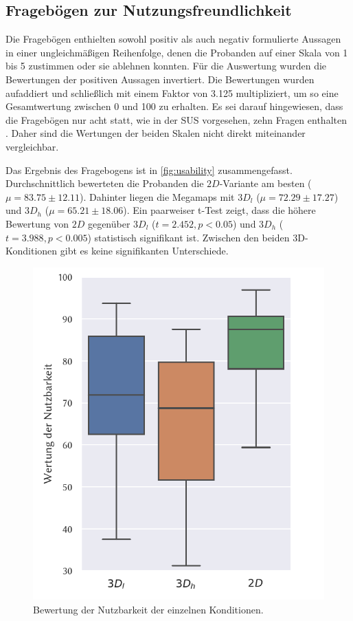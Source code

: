 \subsection{Fragebögen zur Nutzungsfreundlichkeit}
Die Fragebögen enthielten sowohl positiv als auch negativ formulierte Aussagen in einer ungleichmäßigen Reihenfolge, denen die Probanden auf einer Skala von 1 bis 5 zustimmen oder sie ablehnen konnten.
Für die Auswertung wurden die Bewertungen der positiven Aussagen invertiert.
Die Bewertungen wurden aufaddiert und schließlich mit einem Faktor von \num{3,125} multipliziert, um so eine Gesamtwertung zwischen 0 und 100 zu erhalten.
Es sei darauf hingewiesen, dass die Fragebögen nur acht statt, wie in der SUS vorgesehen, zehn Fragen enthalten \autocite{Brooke2013}. 
Daher sind die Wertungen der beiden Skalen nicht direkt miteinander vergleichbar.

Das Ergebnis des Fragebogens ist in \autoref{fig:usability} zusammengefasst.
Durchschnittlich bewerteten die Probanden die $2D$-Variante am besten ($\mu = \num{83,75} \pm \num{12,11}$).
Dahinter liegen die Megamaps mit $3D_l$ ($\mu = \num{72,29} \pm \num{17,27}$) und $3D_h$ ($\mu = \num{65,21} \pm \num{18.06}$).
Ein paarweiser t-Test zeigt, dass die höhere Bewertung von $2D$ gegenüber $3D_l$ ($t = 2.452, p < 0.05$) und $3D_h$ ($t = 3.988, p < 0.005$) statistisch signifikant ist.
Zwischen den beiden 3D-Konditionen gibt es keine signifikanten Unterschiede.
\begin{figure}[h]
    \centering
    \includegraphics[width=0.7\linewidth]{figures/analysis/usability}
    \caption{Bewertung der Nutzbarkeit der einzelnen Konditionen.}
    \label{fig:usability}
\end{figure}

